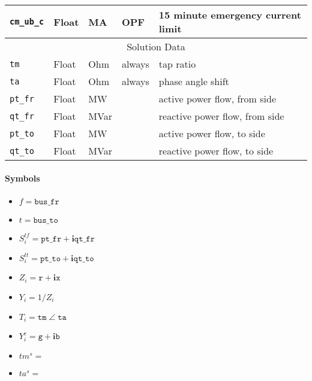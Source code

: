 \documentclass{article}
\begin{document}
\begin{table}[h]
\begin{tabular}{|l|l|l|l|p{7cm}|}
\hline
\texttt{cm\_ub\_c} & Float & MA & OPF & 15 minute emergency current limit \\ 
\hline
%
\hline
\multicolumn{5}{|c|}{Solution Data} \\
\hline
\texttt{tm} & Float & Ohm & always & tap ratio \\ 
\hline
\texttt{ta} & Float & Ohm & always & phase angle shift \\ 
\hline
\texttt{pt\_fr} & Float & MW &  & active power flow, from side \\ 
\hline
\texttt{qt\_fr} & Float & MVar &  & reactive power flow, from side \\ 
\hline
\texttt{pt\_to} & Float & MW &  & active power flow, to side \\ 
\hline
\texttt{qt\_to} & Float & MVar &  & reactive power flow, to side \\ 
\hline
\end{tabular}
\label{tbl:tbd}
\end{table}


\paragraph{Symbols}
\begin{itemize}
    \item $f = \texttt{bus\_fr}$
    \item $t = \texttt{bus\_to}$
    \item $S^{tf}_i = \texttt{pt\_fr} + \bm i \texttt{qt\_fr}$
    \item $S^{tt}_i = \texttt{pt\_to} + \bm i \texttt{qt\_to}$
    \item $Z_i = \texttt{r} + \bm i \texttt{x}$
    \item $Y_i = 1/Z_i$
    \item $T_i = \texttt{tm} \; \angle \; \texttt{ta}$
    \item $Y^c_i = \texttt{g} + \bm i \texttt{b}$
    \item $tm^s = $
    \item $ta^s = $
\end{itemize}
\end{document}
